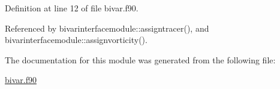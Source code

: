 Definition at line 12 of file bivar.\+f90.



Referenced by bivarinterfacemodule\+::assigntracer(), and bivarinterfacemodule\+::assignvorticity().



The documentation for this module was generated from the following file\+:\begin{DoxyCompactItemize}
\item 
\hyperlink{bivar_8f90}{bivar.\+f90}\end{DoxyCompactItemize}
